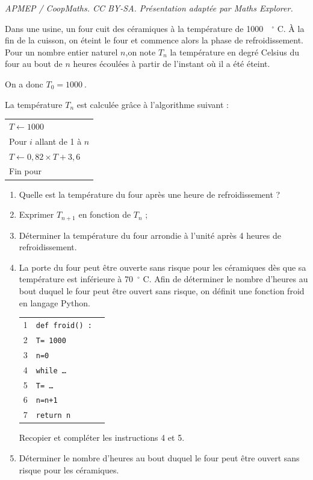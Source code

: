 \documentclass[10pt]{article}
\providecommand{\np}[2][]{{#2~#1}}
\begin{document}
\noindent\textit{APMEP / CoopMaths. CC BY-SA. Présentation adaptée par Maths Explorer.}\par\medskip
\medskip

Dans une usine, un four cuit des céramiques à la température de \np{1000}~\ensuremath{^\circ} C.
À la fin de la cuisson, on éteint le four et commence alors la phase de refroidissement. Pour un nombre entier naturel $n$,on note $T_n$ la température en degré Celsius du four au bout de $n$ heures écoulées à partir de l'instant où il a été éteint. 

On a donc $T_0 = \np{1000}$.

La température $T_n$ est calculée grâce à l'algorithme suivant :

\begin{center}
\begin{tabular}{|l|}\hline
$T \gets \np{1000}$\\
Pour $i$ allant de 1 à $n$\\
\quad $T \gets  0,82\times T + 3,6$\\
Fin pour\\ \hline
\end{tabular}
\end{center}

\medskip

\begin{enumerate}
\item Quelle est la température du four après une heure de refroidissement ?
\item Exprimer $T_{n+1}$ en fonction de $T_n$ ;
\item Déterminer la température du four arrondie à l'unité après 4 heures de refroidissement.
\item La porte du four peut être ouverte sans risque pour les céramiques dès que sa
température est inférieure à 70~\ensuremath{^\circ} C. Afin de déterminer le nombre d'heures au bout duquel le four peut être ouvert sans risque, on définit une fonction \og froid \fg{} en langage Python.

\begin{center}
\begin{tabular}{|c l|}\hline
1&\texttt{def froid() :~\quad~}\\
2&\quad\texttt{T= \np{1000}}\\
3&\quad\texttt{n=0 }\\
4&\quad\texttt{while \ldots}\\
5&\qquad \texttt{T= \ldots}\\
6 &\qquad \texttt{n=n+1} \\
7&\quad\texttt{return n}\\ \hline
\end{tabular}
\end{center}

Recopier et compléter les instructions 4 et 5.
\item Déterminer le nombre d'heures au bout duquel le four peut être ouvert sans risque pour les céramiques.
\end{enumerate}

\bigskip
\end{document}
